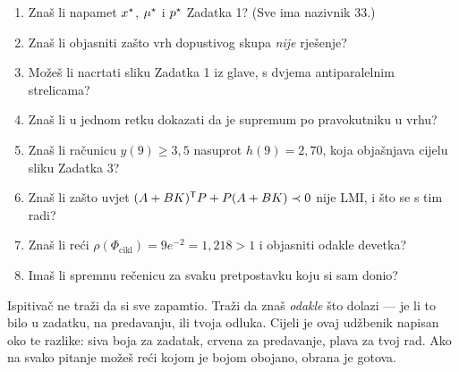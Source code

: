 \begin{predznanje}
\begin{enumerate}[leftmargin=*]
  \item Znaš li napamet $x^{\star}$, $\mu^{\star}$ i $p^{\star}$ Zadatka 1? (Sve ima
        nazivnik $33$.)
  \item Znaš li objasniti zašto vrh dopustivog skupa \emph{nije} rješenje?
  \item Možeš li nacrtati sliku Zadatka 1 iz glave, s dvjema antiparalelnim
        strelicama?
  \item Znaš li u jednom retku dokazati da je supremum po pravokutniku u vrhu?
  \item Znaš li računicu $y(9) \geq 3{,}5$ nasuprot $h(9) = 2{,}70$, koja
        objašnjava cijelu sliku Zadatka 3?
  \item Znaš li zašto uvjet $(A+BK)^{\mathsf{T}} P + P(A+BK) \prec 0$ nije LMI, i što se s
        tim radi?
  \item Znaš li reći $\rho(\Phi_{\mathrm{cikl}}) = 9e^{-2} = 1{,}218 > 1$ i
        objasniti odakle devetka?
  \item Imaš li spremnu rečenicu za svaku pretpostavku koju si sam donio?
\end{enumerate}
\end{predznanje}

\begin{izgovor}
Ispitivač ne traži da si sve zapamtio. Traži da znaš \emph{odakle} što dolazi ---
je li to bilo u zadatku, na predavanju, ili tvoja odluka. Cijeli je ovaj udžbenik
napisan oko te razlike: siva boja za zadatak, crvena za predavanje, plava za tvoj
rad. Ako na svako pitanje možeš reći kojom je bojom obojano, obrana je gotova.
\end{izgovor}
